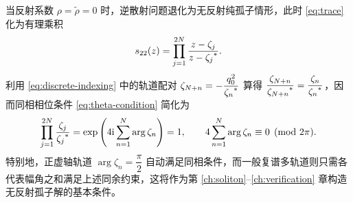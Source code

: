 当反射系数 $\rho=\widetilde\rho=0$ 时，逆散射问题退化为无反射纯孤子情形，此时 \eqref{eq:trace} 化为有理乘积
\begin{equation*}
s_{22}(z)=\prod\limits_{j=1}^{2N}\dfrac{z-\zeta_j}{z-{\zeta_j}^{*}}.
\end{equation*}
利用 \eqref{eq:discrete-indexing} 中的轨道配对 $\zeta_{N+n}=-\dfrac{q_0^2}{{\zeta_n}^{*}}$ 算得 $\dfrac{\zeta_{N+n}}{{\zeta_{N+n}}^{*}}=\dfrac{\zeta_n}{{\zeta_n}^{*}}$，因而同相相位条件 \eqref{eq:theta-condition} 简化为
\begin{equation*}
\prod\limits_{j=1}^{2N}\dfrac{\zeta_j}{{\zeta_j}^{*}}
=\exp\left(4\mathrm{i}\sum\limits_{n=1}^{N}\arg\zeta_n\right)=1,\qquad
4\sum\limits_{n=1}^{N}\arg\zeta_n\equiv0\pmod{2\pi}.
\end{equation*}
特别地，正虚轴轨道 $\arg\zeta_n=\dfrac{\pi}{2}$ 自动满足同相条件，而一般复谱多轨道则只需各代表幅角之和满足上述同余约束，这将作为第 \ref{ch:soliton}--\ref{ch:verification} 章构造无反射孤子解的基本条件。
